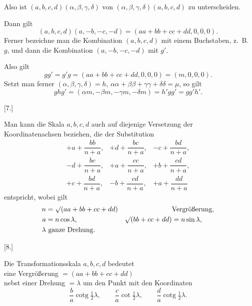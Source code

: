 %
\noindent Also ist $(a,b,c,d)(\alpha,\beta,\gamma,\delta)$ von $(\alpha,\beta,\gamma,\delta)(a,b,c,d)$ zu unterscheiden.

Dann gilt
\[
(a,b,c,d)(a,-b,-c,-d)=(aa+bb+cc+dd,0,0,0).
\]
Ferner bezeichne man die Kombination $(a,b,c,d)$ mit einem Buchstaben, z.~B. $g$, und dann die Kombination $(a,-b,-c,-d)$ mit $g'$.

Also gilt
\[
gg'=g'g=(aa+bb+cc+dd,0,0,0)=(m,0,0,0).
\]
Setzt man ferner $(\alpha,\beta,\gamma,\delta)=h$, $\alpha\alpha+\beta\beta+\gamma\gamma+\delta\delta=\mu$, so gilt
\[
ghg'=(\alpha m,-\beta m,-\gamma m,-\delta m)=h'gg'=gg'h'.
\]

\begin{center}[7.]\end{center}

Man kann die Skala $a,b,c,d$ auch auf diejenige Versetzung der Koordinatenachsen beziehen, die der Substitution
\[
\begin{array}{ccc}
+a+\dfrac{bb}{n+a},&+d+\dfrac{bc}{n+a},&-c+\dfrac{bd}{n+a},\\[6pt]
-d+\dfrac{bc}{n+a},&+a+\dfrac{cc}{n+a},&+b+\dfrac{cd}{n+a},\\[6pt]
+c+\dfrac{bd}{n+a},&-b+\dfrac{cd}{n+a},&+a+\dfrac{dd}{n+a}
\end{array}
\]
entspricht, wobei gilt
\[
\begin{aligned}
n&=\mathord{\surd}(aa+bb+cc+dd)&&\text{Vergrößerung,}\\
a&=n\cos\lambda,&\mathord{\surd}(bb+cc+dd)&=n\sin\lambda,\\
\lambda&\text{ ganze Drehung.}
\end{aligned}
\]

\begin{center}[8.]\end{center}

Die Transformationsskala $a,b,c,d$ bedeutet\\
eine Vergrößerung $=(aa+bb+cc+dd)$\\
nebst einer Drehung $=\lambda$ um den Punkt mit den Koordinaten
\[
\frac ba\operatorname{cotg}\tfrac12\lambda,\qquad
\frac ca\cot\tfrac12\lambda,\qquad
\frac da\operatorname{cotg}\tfrac12\lambda.
\]

